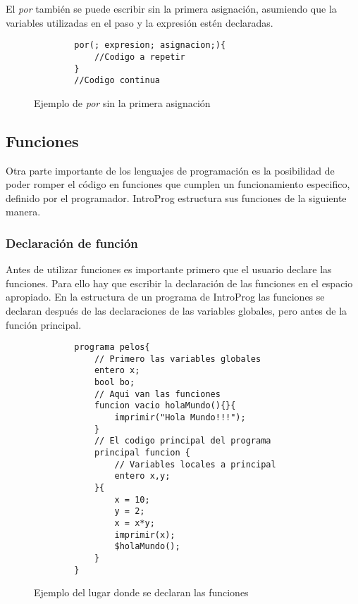 El \emph{por} también se puede escribir sin la primera asignación, asumiendo que la variables utilizadas en el paso y la expresión estén declaradas.


\begin{figure}[!htbp]
    \centering
    
    \begin{lstlisting}
        por(; expresion; asignacion;){
            //Codigo a repetir
        }
        //Codigo continua
    \end{lstlisting}
    \caption{Ejemplo de \emph{por} sin la primera asignación}
\end{figure}

\FloatBarrier
\subsection{Funciones}

Otra parte importante de los lenguajes de programación es la posibilidad de poder romper el código en funciones que cumplen un funcionamiento especifico, definido por el programador. IntroProg estructura sus funciones de la siguiente manera.

\subsubsection{Declaración de función}

Antes de utilizar funciones es importante primero que el usuario declare las funciones. Para ello hay que escribir la declaración de las funciones en el espacio apropiado. En la estructura de un programa de IntroProg las funciones se declaran después de las declaraciones de las variables globales, pero antes de la función principal.

\begin{figure}[!htbp]
    \centering
    
    \begin{lstlisting}
        programa pelos{
            // Primero las variables globales
            entero x;
            bool bo;
            // Aqui van las funciones
            funcion vacio holaMundo(){}{
                imprimir("Hola Mundo!!!");
            }
            // El codigo principal del programa
            principal funcion {
                // Variables locales a principal
                entero x,y;
            }{
                x = 10;
                y = 2;
                x = x*y;
                imprimir(x);
                $holaMundo();
            }
        }
    \end{lstlisting}
    \caption{Ejemplo del lugar donde se declaran las funciones}
\end{figure}
\FloatBarrier

